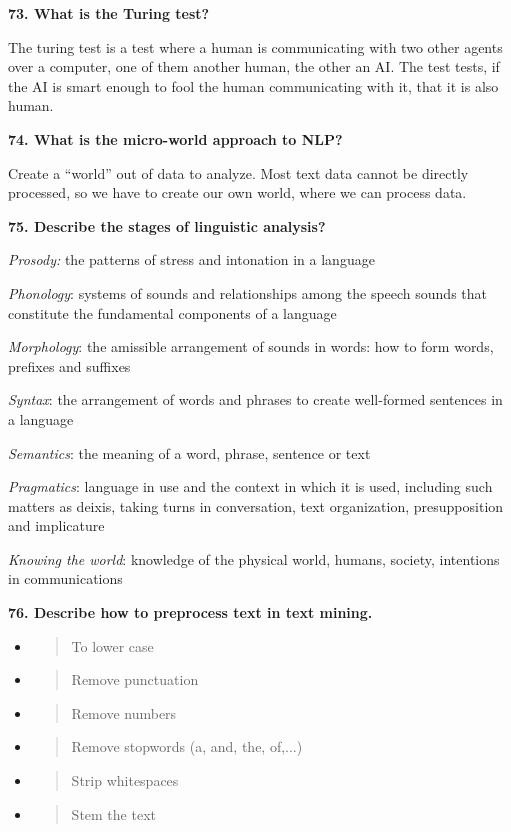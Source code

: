 \textbf{73. What is the Turing test?}

The turing test is a test where a human is communicating with two other
agents over a computer, one of them another human, the other an AI. The
test tests, if the AI is smart enough to fool the human communicating
with it, that it is also human.

\textbf{74. What is the micro-world approach to NLP?}

Create a ``world'' out of data to analyze. Most text data cannot be
directly processed, so we have to create our own world, where we can
process data.

\textbf{75. Describe the stages of linguistic analysis?}

\textit{Prosody:} the patterns of stress and intonation in a language

\textit{Phonology}: systems of sounds and relationships among the
speech sounds that constitute the fundamental components of a language

\textit{Morphology}: the amissible arrangement of sounds in words:
how to form words, prefixes and suffixes

\textit{Syntax}: the arrangement of words and phrases to create
well-formed sentences in a language

\textit{Semantics}: the meaning of a word, phrase, sentence or text

\textit{Pragmatics}: language in use and the context in which it is
used, including such matters as deixis, taking turns in conversation,
text organization, presupposition and implicature

\textit{Knowing the world}: knowledge of the physical world, humans,
society, intentions in communications

\textbf{76. Describe how to preprocess text in text mining.}

\begin{itemize}
\item
  \begin{quote}
  To lower case
  \end{quote}
\item
  \begin{quote}
  Remove punctuation
  \end{quote}
\item
  \begin{quote}
  Remove numbers
  \end{quote}
\item
  \begin{quote}
  Remove stopwords (a, and, the, of,...)
  \end{quote}
\item
  \begin{quote}
  Strip whitespaces
  \end{quote}
\item
  \begin{quote}
  Stem the text
  \end{quote}
\end{itemize}

